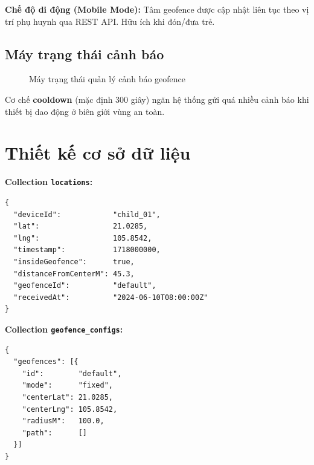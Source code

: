 \documentclass[13pt, a4paper]{report}
\begin{document}
\textbf{Chế độ di động (Mobile Mode):} Tâm geofence được cập nhật liên tục theo vị trí phụ huynh qua REST API. Hữu ích khi đón/đưa trẻ.

\subsection{Máy trạng thái cảnh báo}

\begin{figure}[H]
\centering
{}
\caption{Máy trạng thái quản lý cảnh báo geofence}
\label{fig:alert_state_machine}
\end{figure}

Cơ chế \textbf{cooldown} (mặc định 300 giây) ngăn hệ thống gửi quá nhiều cảnh báo khi thiết bị dao động ở biên giới vùng an toàn.

\section{Thiết kế cơ sở dữ liệu}

\textbf{Collection \texttt{locations}:}
\begin{lstlisting}[caption=Schema collection locations]
{
  "deviceId":            "child_01",
  "lat":                 21.0285,
  "lng":                 105.8542,
  "timestamp":           1718000000,
  "insideGeofence":      true,
  "distanceFromCenterM": 45.3,
  "geofenceId":          "default",
  "receivedAt":          "2024-06-10T08:00:00Z"
}
\end{lstlisting}

\textbf{Collection \texttt{geofence\_configs}:}
\begin{lstlisting}[caption=Schema collection geofence\_configs]
{
  "geofences": [{
    "id":        "default",
    "mode":      "fixed",
    "centerLat": 21.0285,
    "centerLng": 105.8542,
    "radiusM":   100.0,
    "path":      []
  }]
}
\end{lstlisting}
\end{document}
